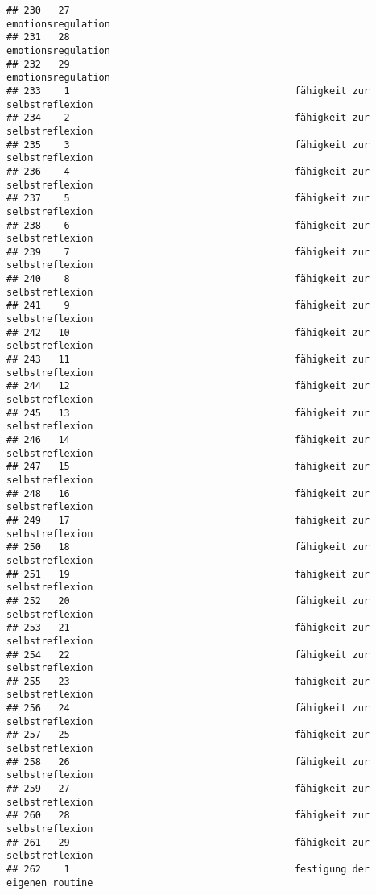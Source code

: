 \documentclass[
]{article}
\begin{document}
\begin{verbatim}
## 230   27                                                  emotionsregulation
## 231   28                                                  emotionsregulation
## 232   29                                                  emotionsregulation
## 233    1                                       fähigkeit zur selbstreflexion
## 234    2                                       fähigkeit zur selbstreflexion
## 235    3                                       fähigkeit zur selbstreflexion
## 236    4                                       fähigkeit zur selbstreflexion
## 237    5                                       fähigkeit zur selbstreflexion
## 238    6                                       fähigkeit zur selbstreflexion
## 239    7                                       fähigkeit zur selbstreflexion
## 240    8                                       fähigkeit zur selbstreflexion
## 241    9                                       fähigkeit zur selbstreflexion
## 242   10                                       fähigkeit zur selbstreflexion
## 243   11                                       fähigkeit zur selbstreflexion
## 244   12                                       fähigkeit zur selbstreflexion
## 245   13                                       fähigkeit zur selbstreflexion
## 246   14                                       fähigkeit zur selbstreflexion
## 247   15                                       fähigkeit zur selbstreflexion
## 248   16                                       fähigkeit zur selbstreflexion
## 249   17                                       fähigkeit zur selbstreflexion
## 250   18                                       fähigkeit zur selbstreflexion
## 251   19                                       fähigkeit zur selbstreflexion
## 252   20                                       fähigkeit zur selbstreflexion
## 253   21                                       fähigkeit zur selbstreflexion
## 254   22                                       fähigkeit zur selbstreflexion
## 255   23                                       fähigkeit zur selbstreflexion
## 256   24                                       fähigkeit zur selbstreflexion
## 257   25                                       fähigkeit zur selbstreflexion
## 258   26                                       fähigkeit zur selbstreflexion
## 259   27                                       fähigkeit zur selbstreflexion
## 260   28                                       fähigkeit zur selbstreflexion
## 261   29                                       fähigkeit zur selbstreflexion
## 262    1                                       festigung der eigenen routine

\end{verbatim}
\end{document}
